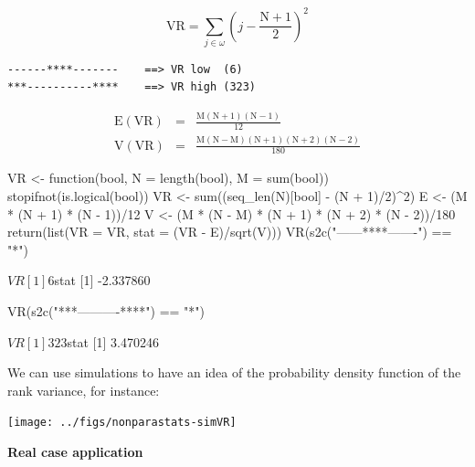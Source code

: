 \documentclass{article}
\begin{document}
$$
\mathrm{VR} = \sum_{j \in \omega}{(j - \mathrm{\frac{N+1}{2}})^2}
$$

\begin{verbatim}
------****-------    ==> VR low  (6)
***----------****    ==> VR high (323)
\end{verbatim}

\begin{eqnarray*}
\mathrm{E(VR)} & = & \mathrm{\frac{M(N + 1)(N-1)}{12}} \\
\mathrm{V(VR)} & = & \mathrm{\frac{M(N - M)(N + 1)(N + 2)(N - 2)}{180}}
\end{eqnarray*}

\begin{Schunk}
\begin{Sinput}
 VR <- function(bool, N = length(bool), M = sum(bool)) {
     stopifnot(is.logical(bool))
     VR <- sum((seq_len(N)[bool] - (N + 1)/2)^2)
     E <- (M * (N + 1) * (N - 1))/12
     V <- (M * (N - M) * (N + 1) * (N + 2) * (N - 2))/180
     return(list(VR = VR, stat = (VR - E)/sqrt(V)))
 }
 VR(s2c("------****-------") == "*")
\end{Sinput}
\begin{Soutput}
$VR
[1] 6

$stat
[1] -2.337860
\end{Soutput}
\begin{Sinput}
 VR(s2c("***----------****") == "*")
\end{Sinput}
\begin{Soutput}
$VR
[1] 323

$stat
[1] 3.470246
\end{Soutput}
\end{Schunk}

We can use simulations to have an idea of the probability density function
of the rank variance, for instance:

\begin{Schunk}
\end{Schunk}
\texttt{[image: ../figs/nonparastats-simVR]}

\noindent\textbf{Real case application}
\end{document}
